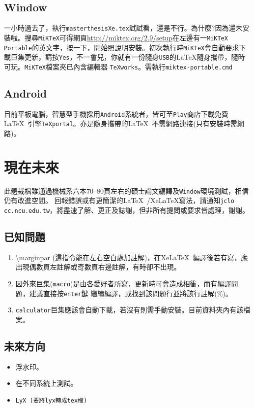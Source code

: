 \subsection{Window}
一小時過去了，執行{\tt masterthesisXe.tex}試試看，還是不行。為什麼?因為還未安裝啦。搜尋{\tt MiKTeX}可得網頁\url{http://miktex.org/2.9/setup}在左邊有一{\tt MiKTeX Portable}的英文字，按一下，開始照說明安裝。初次執行時{\tt MiKTeX}會自動要求下載巨集更新，請按{\tt Yes}，不一會兒，你就有一份隨身{\tt USB}的\LaTeX{}隨身攜帶，隨時可玩。{\tt MiKTeX}檔案夾已內含編輯器 {\tt TeXworks}。需執行{\tt miktex-portable.cmd}

\subsection{Android}
目前平板電腦，智慧型手機採用{\tt Android}系統者，皆可至{\tt Play}商店下載免費\LaTeX\ 引擎{\tt \TeX portal}。亦是隨身攜帶的\LaTeX\ 不需網路連接(只有安裝時需網路)。


\section{現在未來}
此體裁檔雖通過機械系六本70--80頁左右的碩士論文編譯及{\tt Window}環境測試，相信仍有改進空間。 回報錯誤或有更簡潔的\LaTeX\ /Xe\LaTeX{}寫法，請通知{\tt jclo cc.ncu.edu.tw}，將盡速了解、更正及誌謝，但非所有提問或要求皆處理，謝謝。

\subsection{已知問題}
\begin{enumerate}
\item   \textbackslash marginpar (這指令能在左右空白處加註解)，在Xe\LaTeX\ 編譯後若有寫，應出現偶數頁左註解或奇數頁右邊註解，有時卻不出現。
\item 因外來巨集({\tt macro})是由各愛好者所寫，更新時可會造成相衝，而有編譯問題，建議直接按{\tt enter}鍵 繼續編譯，或找到該問題行並將該行註解(\%)。
\item {\tt calculator}巨集應該會自動下載，若沒有則需手動安裝。目前資料夾內有該檔案。
\end{enumerate}

\subsection{未來方向}
\begin{itemize}
\item 浮水印。
\item 在不同系統上測試。
\item {\tt LyX (要將lyx轉成tex檔)}  \index{\TeX!}
\end{itemize}
\vfill
